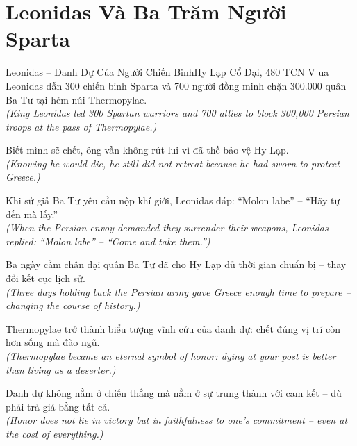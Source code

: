 \section{Leonidas Và Ba Trăm Người Sparta}
\begin{truyen}{Leonidas -- Danh Dự Của Người Chiến Binh}{Hy Lạp Cổ Đại, 480 TCN}
V ua Leonidas dẫn 300 chiến binh Sparta và 700 người đồng minh chặn 300.000 quân Ba Tư tại hẻm núi Thermopylae.\\
\textit{(King Leonidas led 300 Spartan warriors and 700 allies to block 300,000 Persian troops at the pass of Thermopylae.)}

Biết mình sẽ chết, ông vẫn không rút lui vì đã thề bảo vệ Hy Lạp.\\
\textit{(Knowing he would die, he still did not retreat because he had sworn to protect Greece.)}

Khi sứ giả Ba Tư yêu cầu nộp khí giới, Leonidas đáp: ``Molon labe'' -- ``Hãy tự đến mà lấy.''\\
\textit{(When the Persian envoy demanded they surrender their weapons, Leonidas replied: ``Molon labe'' -- ``Come and take them.'')}

Ba ngày cầm chân đại quân Ba Tư đã cho Hy Lạp đủ thời gian chuẩn bị -- thay đổi kết cục lịch sử.\\
\textit{(Three days holding back the Persian army gave Greece enough time to prepare -- changing the course of history.)}

Thermopylae trở thành biểu tượng vĩnh cửu của danh dự: chết đúng vị trí còn hơn sống mà đào ngũ.\\
\textit{(Thermopylae became an eternal symbol of honor: dying at your post is better than living as a deserter.)}

\end{truyen}
\begin{baihoc}
  Danh dự không nằm ở chiến thắng mà nằm ở sự trung thành với cam kết -- dù phải trả giá bằng tất cả.\\
  \textit{(Honor does not lie in victory but in faithfulness to one's commitment -- even at the cost of everything.)}
\end{baihoc}

